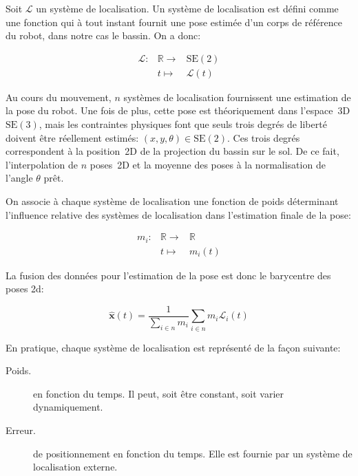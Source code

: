 Soit $\mathcal{L}$ un système de localisation. Un système de
localisation est défini comme une fonction qui à tout instant fournit
une pose estimée d'un corps de référence du robot, dans notre cas le
bassin. On a donc:

\begin{equation}
  \begin{array}{ccc}
    \mathcal{L} : & \mathbb{R} \rightarrow & \text{SE}(2)\\
      & t \mapsto & \mathcal{L}(t)
  \end{array}
\end{equation}

Au cours du mouvement, $n$ systèmes de localisation fournissent une
estimation de la pose du robot. Une fois de plus, cette pose est
théoriquement dans l'espace 3D $\text{SE}(3)$, mais les contraintes
physiques font que seuls trois degrés de liberté doivent être
réellement estimés: $(x, y, \theta) \in \text{SE}(2)$. Ces trois
degrés correspondent à la position 2D de la projection du bassin sur
le sol. De ce fait, l'interpolation de $n$ poses 2D et la moyenne des
poses à la normalisation de l'angle $\theta$ prêt.


On associe à chaque système de localisation une fonction de poids
déterminant l'influence relative des systèmes de localisation dans
l'estimation finale de la pose:

\begin{equation}
  \begin{array}{ccc}
    m_i : & \mathbb{R} \rightarrow & \mathbb{R}\\
      & t \mapsto & m_i(t)
  \end{array}
\end{equation}

La fusion des données pour l'estimation de la pose est donc le
barycentre des poses 2d:

\begin{equation}
  \mathbf{\hat{x}}(t) = \frac{1}{\sum_{i \in n} m_i} \sum_{i \in n} m_i \mathcal{L}_i(t)
\end{equation}

En pratique, chaque système de localisation est représenté de la façon suivante:
\begin{description}
\item[Poids.] en fonction du temps. Il peut, soit être constant, soit
  varier dynamiquement.
\item[Erreur.] de positionnement en fonction du temps. Elle est fournie
  par un système de localisation externe.
\end{description}


